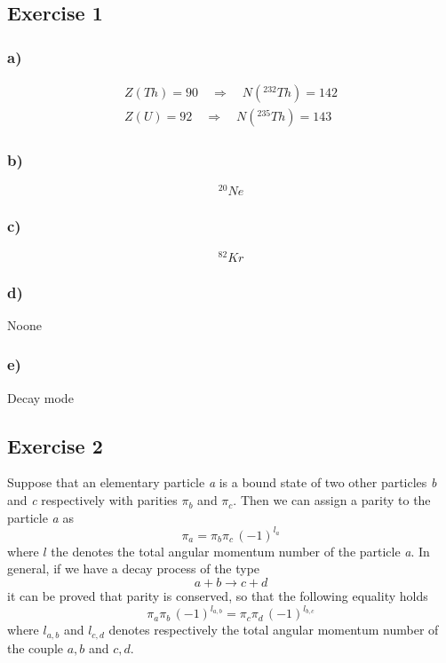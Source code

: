 \subsection*{Exercise 1}

\subsubsection*{a)}
\begin{gather*}
    Z(Th) = 90 \quad\Rightarrow\quad N(^{232}Th) = 142 \\
    Z(U) = 92 \quad\Rightarrow\quad N(^{235}Th) = 143
\end{gather*}

\subsubsection*{b)}
$$ ^{20}Ne $$

\subsubsection*{c)}
$$ ^{82}Kr $$

\subsubsection*{d)}
Noone

\subsubsection*{e)}
Decay mode

\subsection*{Exercise 2}
Suppose that an elementary particle \emph{a} is a bound state of two other particles \emph{b} and \emph{c}
respectively with parities $\pi_b$ and $\pi_c$. Then we can assign a parity to the particle \emph{a} as
\begin{equation}
    \pi_a = \pi_b \pi_c \, (-1)^{l_a}
\end{equation}
where $l$ the denotes the total angular momentum number of the particle \emph{a}.
In general, if we have a decay process of the type $$a + b \rightarrow c + d$$ it can be proved that parity
is conserved, so that the following equality holds 
\begin{equation}
     \pi_a \pi_b \, (-1)^{l_{a,b}} = \pi_c \pi_d \, (-1)^{l_{b,c}}
\end{equation}
where $l_{a,b}$ and $l_{c,d}$ denotes respectively the total angular momentum number of the couple $a, b$ 
and $c, d$.

